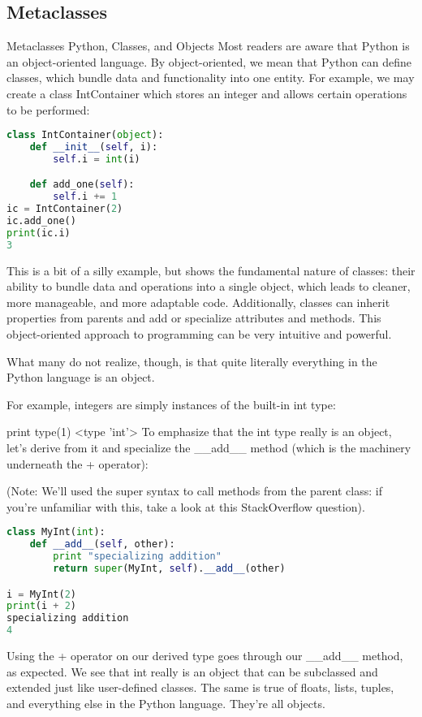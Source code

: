 \subsection{Metaclasses}

Metaclasses
Python, Classes, and Objects
Most readers are aware that Python is an object-oriented language. By object-oriented, we mean that Python can define classes, which bundle data and functionality into one entity. For example, we may create a class IntContainer which stores an integer and allows certain operations to be performed:

\begin{lstlisting}[language=Python]
class IntContainer(object):
    def __init__(self, i):
        self.i = int(i)

    def add_one(self):
        self.i += 1
ic = IntContainer(2)
ic.add_one()
print(ic.i)
3
\end{lstlisting}

This is a bit of a silly example, but shows the fundamental nature of classes: their ability to bundle data and operations into a single object, which leads to cleaner, more manageable, and more adaptable code. Additionally, classes can inherit properties from parents and add or specialize attributes and methods. This object-oriented approach to programming can be very intuitive and powerful.

What many do not realize, though, is that quite literally everything in the Python language is an object.

For example, integers are simply instances of the built-in int type:

print type(1)
<type 'int'>
To emphasize that the int type really is an object, let's derive from it and specialize the __add__ method (which is the machinery underneath the + operator):

(Note: We'll used the super syntax to call methods from the parent class: if you're unfamiliar with this, take a look at this StackOverflow question).

\begin{lstlisting}[language=Python]
class MyInt(int):
    def __add__(self, other):
        print "specializing addition"
        return super(MyInt, self).__add__(other)

i = MyInt(2)
print(i + 2)
specializing addition
4
\end{lstlisting}

Using the + operator on our derived type goes through our __add__ method, as expected. We see that int really is an object that can be subclassed and extended just like user-defined classes. The same is true of floats, lists, tuples, and everything else in the Python language. They're all objects.

